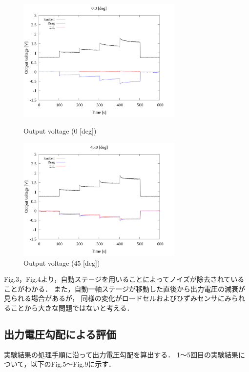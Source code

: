 \documentclass[twocolumn,a4j]{jsarticle}
\begin{document}
\begin{figure}[htbp]
    \footnotesize
    \begin{center}
        \includegraphics[width=82mm]{../../../02_workspace/result/2-1/plot/01-3_allsensors/01_allsensors_0.png}
        \caption{Output voltage (0 [deg])}
        \includegraphics[width=82mm]{../../../02_workspace/result/2-1/plot/01-3_allsensors/01_allsensors_450.png}
        \caption{Output voltage (45 [deg])}
    \end{center}
\end{figure}

\newpage
Fig.3，Fig.4より，自動ステージを用いることによってノイズが除去されていることがわかる．
また，自動一軸ステージが移動した直後から出力電圧の減衰が見られる場合があるが，
同様の変化がロードセルおよびひずみセンサにみられることから大きな問題ではないと考える．\\

\subsection{出力電圧勾配による評価}

実験結果の処理手順に沿って出力電圧勾配を算出する．
1～5回目の実験結果について，以下のFig.5～Fig.9に示す．
\end{document}
